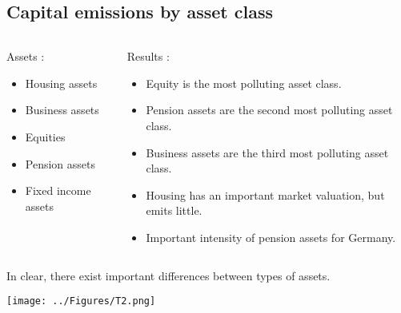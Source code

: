 \documentclass{beamer}
\newcommand\ReduceFont{\fontsize{10}{7.2}\selectfont}
\begin{document}
\subsection{Capital emissions by asset class}

\begin{frame}{\subsecname}
    \begin{columns}
        \begin{column}{0.5\textwidth}
            Assets :
                \begin{itemize} 
                    \item Housing assets
                    \item Business assets
                    \item Equities 
                    \item Pension assets
                    \item Fixed income assets
                \end{itemize}
        \end{column}
        \begin{column}{0.5\textwidth}
            \ReduceFont
            Results : 
                \begin{itemize}
                    \item Equity is the most polluting asset class.
                    \item Pension assets are the second most polluting asset class.
                    \item Business assets are the third most polluting asset class.
                    \item Housing has an important market valuation, but emits little.
                    \item Important intensity of pension assets for Germany.
                \end{itemize}    
        \end{column}
    \end{columns}
    \hfill \break
    In clear, there exist important differences between types of assets.
\end{frame}

\begin{frame}{\subsecname}
    \begin{center}
        \texttt{[image: ../Figures/T2.png]}    
    \end{center}
\end{frame}
\end{document}
